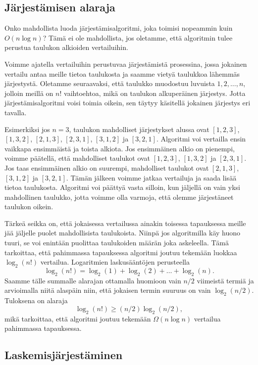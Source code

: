 \subsection{Järjestämisen alaraja}

Onko mahdollista luoda järjestämisalgoritmi, joka toimisi
nopeammin kuin $O(n \log n)$?
Tämä ei ole mahdollista, jos oletamme, että algoritmin
tulee perustua taulukon alkioiden vertailuihin.

Voimme ajatella vertailuihin perustuvaa järjestämistä
prosessina, jossa jokainen vertailu antaa meille tietoa
taulukosta ja saamme vietyä taulukkoa lähemmäs järjestystä.
Oletamme seuraavaksi, että taulukko muodostuu luvuista
$1,2,\dots,n$, jolloin meillä on $n!$ vaihtoehtoa, mikä
on taulukon alkuperäinen järjestys.
Jotta järjestämisalgoritmi voisi toimia oikein,
sen täytyy käsitellä jokainen järjestys eri tavalla.

Esimerkiksi jos $n=3$, taulukon mahdolliset järjestykset alussa ovat
$[1,2,3]$, $[1,3,2]$, $[2,1,3]$, $[2,3,1]$, $[3,1,2]$ ja $[3,2,1]$.
Algoritmi voi vertailla ensin vaikkapa ensimmäistä ja toista alkiota.
Jos ensimmäinen alkio on pienempi, voimme päätellä,
että mahdolliset taulukot ovat $[1,2,3]$, $[1,3,2]$ ja $[2,3,1]$.
Jos taas ensimmäinen alkio on suurempi,
mahdolliset taulukot ovat $[2,1,3]$, $[3,1,2]$ ja $[3,2,1]$.
Tämän jälkeen voimme jatkaa vertailuja ja saada lisää tietoa taulukosta.
Algoritmi voi päättyä vasta silloin, kun jäljellä on vain yksi
mahdollinen taulukko, jotta voimme olla varmoja, että olemme
järjestäneet taulukon oikein.

Tärkeä seikka on, että jokaisessa vertailussa ainakin toisessa
tapauksessa meille jää jäljelle puolet mahdollisista taulukoista.
Niinpä jos algoritmilla käy huono tuuri, se voi enintään puolittaa
taulukoiden määrän joka askeleella.
Tämä tarkoittaa, että pahimmassa tapauksessa algoritmi joutuu
tekemään luokkaa $\log_2(n!)$ vertailua.
Logaritmien laskusääntöjen perusteella
\[
\log_2(n!) = \log_2(1)+\log_2(2)+\dots+\log_2(n).
\]
Saamme tälle summalle alarajan ottamalla huomioon vain
$n/2$ viimeistä termiä ja arvioimalla niitä alaspäin niin, 
että jokaisen termin suuruus on vain $\log_2(n/2)$. Tuloksena on alaraja
\[
\log_2(n!) \ge (n/2) \log_2(n/2),
\]
mikä tarkoittaa, että algoritmi joutuu
tekemään $\Omega(n \log n)$ vertailua pahimmassa tapauksessa.

\subsection{Laskemisjärjestäminen}

